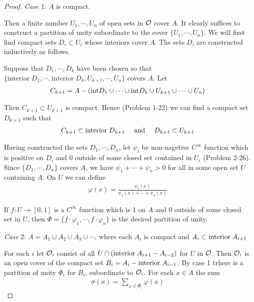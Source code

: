 \begin{proof}
    \textit{Case} 1: $A$ is compact.\par 
    Then a finite number $U_1, \cdots, U_n$ of open sets in $\mathcal{O}$ cover $A$.
    It clearly suffices to construct a partition of unity subordinate
    to the cover $\{U_1, \cdots, U_n\}$. We will first find compact sets $D_i \subset U_i$ 
    whose interiors cover $A$. The sets $D_i$ are constructed inductively as follows.
    
    Suppose that $D_1, \cdots ,D_k$ have been chosen so that \\
    $\{\text{interior}\; D_1, \cdots, \text{interior}\;D_k, U_{k+l}, \cdots, U_n\}$ covers $A$. Let 
    \begin{align*}
        C_{k+1} = 
        A - (\mathrm{int} D_1\cup \cdots \cup \mathrm{int} D_k \cup U_{k+1} \cup \cdots \cup U_n)
    \end{align*}
    
    Then $C_{k+1}\subset U_{k+1}$ is compact. Hence (Problem 1-22) we can find a compact set
    $D_{k+1}$ such that 
    \begin{align*}
        C_{k+1} \subset \mathrm{interior}\; D_{k+1} && \text{ and } && D_{k+1} \subset U_{k+1}
    \end{align*} 

    Having constructed the sets $D_1, \cdots, D_n$, let $\psi_i$  be non-nagetive $C^\infty$
    function which is positive on $D_i$ and 0 outside of some closed set contained in $U_i$ (Problem 
    2-26). Since $\{D_1, \cdots, D_n\}$ covers $A$, we have $\psi_1+\cdots +\psi_n>0$ for all 
    in some open set $U$ containing $A$. On $U$ we can define 
    \begin{align*}
        \varphi(x) = \frac{\psi_i(x)}{\psi_1(x)+\cdots +\psi_n(x)}
    \end{align*}

    If $f\colon{}U\to [0,1]$ is a $C^\infty$ function which is 1 on $A$ and 0 outside of some closed set
    in $U$, then $\Phi = \{f\cdot \varphi_1, \cdots, f\cdot\varphi_n\}$ is the desired partition of 
    unity.

    \textit{Case} 2: $A = A_1\cup A_2\cup A_3\cup \cdots $, where each $A_i$ is compact 
    and $A_i\subset \mathrm{interior}\; A_{i+1}$\par 
    For each $i$ let $\mathcal{O}_i$ consist of all $U\cap (\mathrm{interior}\;A_{i+1}-A_{i-2})$ for $U$ in 
    $\mathcal{O}$. Then $\mathcal{O}_i$ is an open cover of the compact set $B_i=A_i - \mathrm{interior}\; A_{i-1}$. 
    By case 1 trhere is a partition of unity $\Phi_i$ for $B_i$, subordinate to $\mathcal{O}_i$. For 
    each $x\in A$ the sum 
    \begin{align*}
        \sigma(x) = \sum_{\varphi\in \Phi_i} \varphi(x)
    \end{align*} 


\end{proof}
